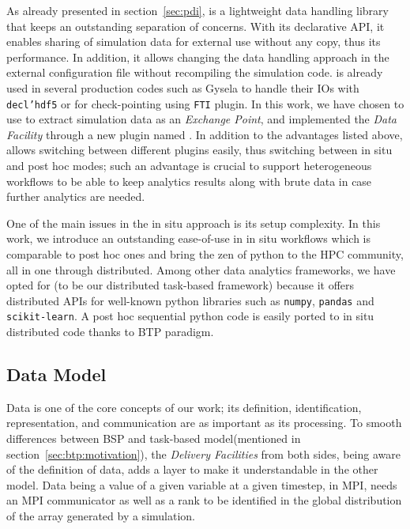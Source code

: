 As already presented in section~\ref{sec:pdi}, \pdi is a lightweight data handling library that keeps an outstanding separation of concerns. With its declarative API, it enables sharing of simulation data for external use without any copy, thus its performance. In addition, it allows changing the data handling approach in the external configuration file without recompiling the simulation code. \pdi is already used in several production codes such as Gysela\cite{bigot:hal-01050322-gysela, latu:hal-01834323-gysela, latu:hal-01719208-gysela} to handle their IOs with \texttt{decl'hdf5} or for check-pointing using \texttt{FTI} plugin.      
In this work, we have chosen to use \pdi to extract simulation data as an \textit{Exchange Point}, and implemented the \textit{Data Facility} through a new \pdi plugin named \deisa. In addition to the advantages listed above, \pdi allows switching between different plugins easily, thus switching between in situ and post hoc modes; such an advantage is crucial to support heterogeneous workflows to be able to keep analytics results along with brute data in case further analytics are needed. 

One of the main issues in the in situ approach is its setup complexity. In this work, we introduce an outstanding ease-of-use in in situ workflows which is comparable to post hoc ones and bring the zen of python to the HPC community, all in one through \dask distributed. Among other data analytics frameworks, we have opted for \dask (to be our distributed task-based framework) because it offers distributed APIs for well-known python libraries such as \texttt{numpy}, \texttt{pandas} and \texttt{scikit-learn}. A post hoc sequential python code is easily ported to in situ distributed \dask code thanks to BTP paradigm.     




\subsection{Data Model}\label{sec:btpImp:datamodel}
Data is one of the core concepts of our work; its definition, identification, representation, and communication are as important as its processing. To smooth  differences between BSP and task-based model(mentioned in section~\ref{sec:btp:motivation}), the \textit{Delivery Facilities} from both sides, being aware of the definition of data, adds a layer to make it understandable in the other model. Data being a value of a given variable at a given timestep, in MPI, needs an MPI communicator as well as a rank to be identified in the global distribution of the array generated by a simulation.    

